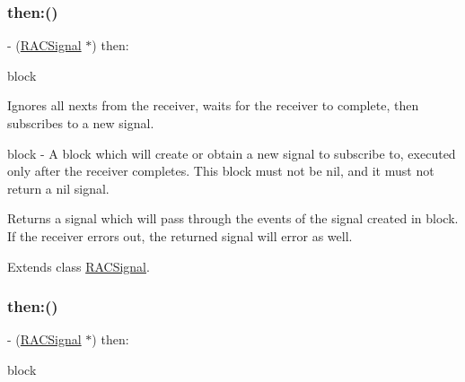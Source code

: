 \mbox{\label{category_r_a_c_signal_07_operations_08_aeed35de5a36e70f87721a0ad6ffabecd}} 
\subsubsection{\texorpdfstring{then\+:()}{then:()}\hspace{0.1cm}{\footnotesize\ttfamily [1/3]}}
{\footnotesize\ttfamily -\/ (\mbox{\hyperlink{interface_r_a_c_signal}{R\+A\+C\+Signal}} $\ast$) then\+: \begin{DoxyParamCaption}\item[{(\mbox{\hyperlink{interface_r_a_c_signal}{R\+A\+C\+Signal}} $\ast$($^\wedge$)(void))}]{block }\end{DoxyParamCaption}}

Ignores all {\ttfamily next}s from the receiver, waits for the receiver to complete, then subscribes to a new signal.

block -\/ A block which will create or obtain a new signal to subscribe to, executed only after the receiver completes. This block must not be nil, and it must not return a nil signal.

Returns a signal which will pass through the events of the signal created in {\ttfamily block}. If the receiver errors out, the returned signal will error as well. 

Extends class \mbox{\hyperlink{interface_r_a_c_signal_aeed35de5a36e70f87721a0ad6ffabecd}{R\+A\+C\+Signal}}.

\mbox{\label{category_r_a_c_signal_07_operations_08_aeed35de5a36e70f87721a0ad6ffabecd}} 
\subsubsection{\texorpdfstring{then\+:()}{then:()}\hspace{0.1cm}{\footnotesize\ttfamily [2/3]}}
{\footnotesize\ttfamily -\/ (\mbox{\hyperlink{interface_r_a_c_signal}{R\+A\+C\+Signal}} $\ast$) then\+: \begin{DoxyParamCaption}\item[{(\mbox{\hyperlink{interface_r_a_c_signal}{R\+A\+C\+Signal}} $\ast$($^\wedge$)(void))}]{block }\end{DoxyParamCaption}}

